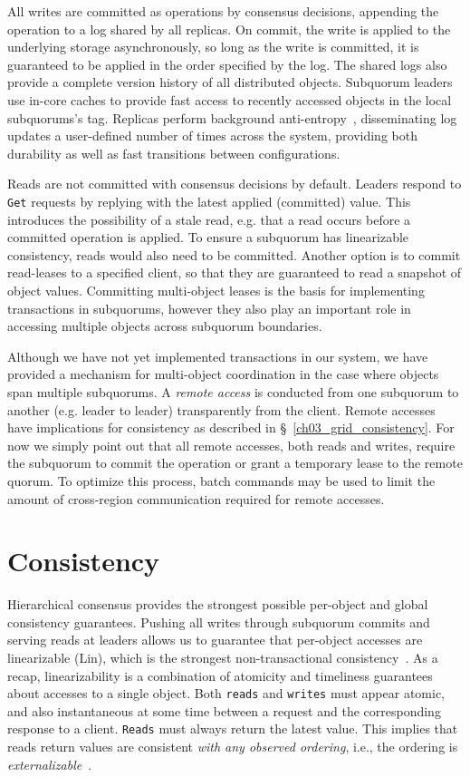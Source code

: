 All writes are committed as operations by consensus decisions, appending the operation to a log shared by all replicas.
On commit, the write is applied to the underlying storage asynchronously, so long as the write is committed, it is guaranteed to be applied in the order specified by the log.
The shared logs also provide a complete version history of all distributed objects.
Subquorum leaders use in-core caches to provide fast access to recently accessed objects in the local subquorums's tag.
Replicas perform background anti-entropy~\cite{dynamo,bayou,anti_entropy}, disseminating log updates a user-defined number of times across the system, providing both durability as well as fast transitions between configurations.

Reads are not committed with consensus decisions by default.
Leaders respond to \texttt{Get} requests by replying with the latest applied (committed) value.
This introduces the possibility of a stale read, e.g. that a read occurs before a committed operation is applied.
To ensure a subquorum has linearizable consistency, reads would also need to be committed.
Another option is to commit read-leases to a specified client, so that they are guaranteed to read a snapshot of object values.
Committing multi-object leases is the basis for implementing transactions in subquorums, however they also play an important role in accessing multiple objects across subquorum boundaries.

Although we have not yet implemented transactions in our system, we have provided a mechanism for multi-object coordination in the case where objects span multiple subquorums.
A \emph{remote access} is conducted from one subquorum to another (e.g. leader to leader) transparently from the client.
Remote accesses have implications for consistency as described in \S~\ref{ch03_grid_consistency}.
For now we simply point out that all remote accesses, both reads and writes, require the subquorum to commit the operation or grant a temporary lease to the remote quorum.
To optimize this process, batch commands may be used to limit the amount of cross-region communication required for remote accesses.

\section{Consistency}
\label{ch03_consistency}

Hierarchical consensus provides the strongest possible per-object and global consistency guarantees.
Pushing all writes through subquorum commits and serving reads at leaders allows us to guarantee that per-object accesses are linearizable (Lin), which is the strongest non-transactional consistency~\cite{linearizability,sequential_consistency}.
As a recap, linearizability is a combination of atomicity and timeliness guarantees about accesses to a single object.
Both \texttt{reads} and \texttt{writes} must appear atomic, and also instantaneous at some time between a request and the corresponding response to a client.
\texttt{Reads} must always return the latest value.
This implies that reads return values are consistent \emph{with any observed ordering}, i.e., the ordering is \emph{externalizable}~\cite{externalizable}.

